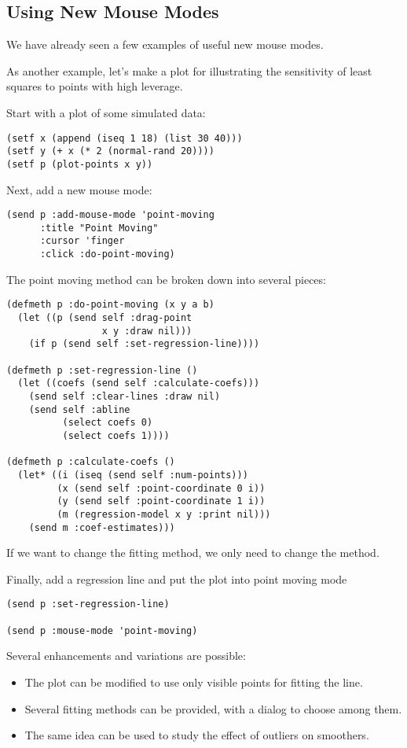 \begin{slide}{}
\subsection{Using New Mouse Modes}
We have already seen a few examples of useful new mouse modes.

As another example, let's make a plot for illustrating the
sensitivity of least squares to points with high leverage.

Start with a plot of some simulated data:
{\Large
\begin{verbatim}
(setf x (append (iseq 1 18) (list 30 40)))
(setf y (+ x (* 2 (normal-rand 20))))
(setf p (plot-points x y))
\end{verbatim}}
Next, add a new mouse mode:
{\Large
\begin{verbatim}
(send p :add-mouse-mode 'point-moving
      :title "Point Moving"
      :cursor 'finger
      :click :do-point-moving)
\end{verbatim}}
\end{slide}

\begin{slide}{}
The point moving method can be broken down into several pieces:
{\Large
\begin{verbatim}
(defmeth p :do-point-moving (x y a b)
  (let ((p (send self :drag-point
                 x y :draw nil)))
    (if p (send self :set-regression-line))))

(defmeth p :set-regression-line ()
  (let ((coefs (send self :calculate-coefs)))
    (send self :clear-lines :draw nil)
    (send self :abline
          (select coefs 0)
          (select coefs 1))))

(defmeth p :calculate-coefs ()
  (let* ((i (iseq (send self :num-points)))
         (x (send self :point-coordinate 0 i))
         (y (send self :point-coordinate 1 i))
         (m (regression-model x y :print nil)))
    (send m :coef-estimates)))
\end{verbatim}}
\end{slide}

\begin{slide}{}
If we want to change the fitting method, we only need to change the
 method.

Finally, add a regression line and put the plot into point
moving mode
{\Large
\begin{verbatim}
(send p :set-regression-line)

(send p :mouse-mode 'point-moving)
\end{verbatim}}

Several enhancements and variations are possible:
\begin{itemize}
\item
The plot can be modified to use only visible points
for fitting the line.
\item
Several fitting methods can be provided, with a dialog to choose
among them.
\item
The same idea can be used to study the effect of outliers on smoothers.
\end{itemize}
\end{slide}

